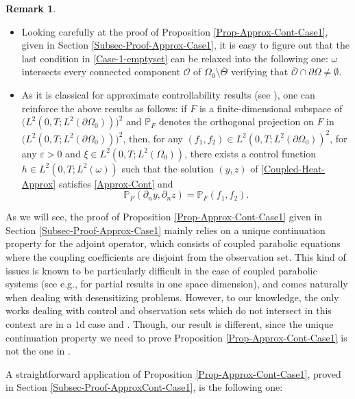 \documentclass[11pt]{article}
\newcommand{\eg}{e.g.,\xspace}
\newcommand{\skpt}{\smallskip}
\numberwithin{equation}{section}
\theoremstyle{definition}
\newtheorem{remark}[theorem]{Remark}
\begin{document}
\skpt
\begin{remark}
\begin{itemize}
\item Looking carefully at the proof of Proposition \ref{Prop-Approx-Cont-Case1}, given in Section \ref{Subsec-Proof-Approx-Case1}, it is easy to figure out that the last condition in \eqref{Case-1-emptyset} can be relaxed {into the following one: $\omega$ intersects every connected component $\mathcal O$ of $\Omega_0 \setminus \overline\Theta$ verifying that $\overline{\mathcal O} \cap \partial \Omega \not = \emptyset$.}

\item As it is classical for approximate controllability results (see \cite{Zuazua-97,FernandezCaraZuazua1,Ervedoza-Note-2020}), one can reinforce the above results as follows: if $F$ is a finite-dimensional subspace of $\bigl(L^2(0, T; L^2(\partial \Omega_0))\bigr)^2$ and $\mathbb{P}_F$ denotes the orthogonal projection on $F$ in $\bigl(L^2(0, T; L^2(\partial \Omega_0))\bigr)^2$, then, for any $(f_1, f_2) \in L^2(0,T; L^2(\partial \Omega_0))^2$, for any $\varepsilon >0$ and $\xi \in L^2(0,T; L^2(\Omega_0))$, there exists a control function $h \in L^2(0,T; L^2(\omega))$ such that the solution $(y,z)$ of \eqref{Coupled-Heat-Approx} satisfies \eqref{Approx-Cont} and
\[
\mathbb{P}_F (\partial_n y, \partial_n z) = \mathbb{P}_F (f_1, f_2).
\]
\end{itemize}
\end{remark}

As we will see, the proof of Proposition \ref{Prop-Approx-Cont-Case1} given in Section \ref{Subsec-Proof-Approx-Case1} mainly relies on a unique continuation property for the adjoint operator, which consists of coupled parabolic equations where the coupling coefficients are disjoint from the observation set. This kind of issues is known to be particularly difficult in the case of coupled parabolic systems (see \eg \cite{mousquetaires} for partial results in one space dimension), and comes naturally when dealing with desensitizing problems. However, to our knowledge, the only works dealing with control and observation sets which do not intersect in this context are \cite{Micu-Ortega-deTeresa} in a $1$d case and \cite{Kavian-De-Teresa}. Though, our result is different, since the unique continuation property we need to prove Proposition \ref{Prop-Approx-Cont-Case1} is not the one in \cite{Micu-Ortega-deTeresa,Kavian-De-Teresa}.

A straightforward application of Proposition \ref{Prop-Approx-Cont-Case1}, proved in Section \ref{Subsec-Proof-ApproxCont-Case1}, is the following one:
\end{document}
